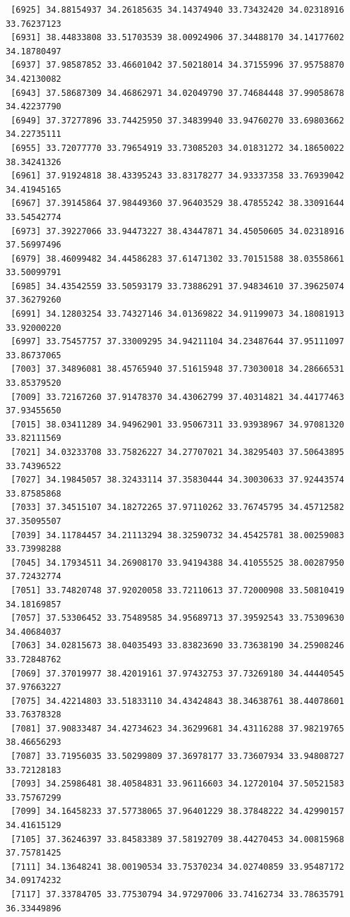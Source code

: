 \documentclass[
  letterpaper,
  DIV=11,
  numbers=noendperiod]{scrartcl}
\begin{document}
\begin{verbatim}
 [6925] 34.88154937 34.26185635 34.14374940 33.73432420 34.02318916 33.76237123
 [6931] 38.44833808 33.51703539 38.00924906 37.34488170 34.14177602 34.18780497
 [6937] 37.98587852 33.46601042 37.50218014 34.37155996 37.95758870 34.42130082
 [6943] 37.58687309 34.46862971 34.02049790 37.74684448 37.99058678 34.42237790
 [6949] 37.37277896 33.74425950 37.34839940 33.94760270 33.69803662 34.22735111
 [6955] 33.72077770 33.79654919 33.73085203 34.01831272 34.18650022 38.34241326
 [6961] 37.91924818 38.43395243 33.83178277 34.93337358 33.76939042 34.41945165
 [6967] 37.39145864 37.98449360 37.96403529 38.47855242 38.33091644 33.54542774
 [6973] 37.39227066 33.94473227 38.43447871 34.45050605 34.02318916 37.56997496
 [6979] 38.46099482 34.44586283 37.61471302 33.70151588 38.03558661 33.50099791
 [6985] 34.43542559 33.50593179 33.73886291 37.94834610 37.39625074 37.36279260
 [6991] 34.12803254 33.74327146 34.01369822 34.91199073 34.18081913 33.92000220
 [6997] 33.75457757 37.33009295 34.94211104 34.23487644 37.95111097 33.86737065
 [7003] 37.34896081 38.45765940 37.51615948 37.73030018 34.28666531 33.85379520
 [7009] 33.72167260 37.91478370 34.43062799 37.40314821 34.44177463 37.93455650
 [7015] 38.03411289 34.94962901 33.95067311 33.93938967 34.97081320 33.82111569
 [7021] 34.03233708 33.75826227 34.27707021 34.38295403 37.50643895 33.74396522
 [7027] 34.19845057 38.32433114 37.35830444 34.30030633 37.92443574 33.87585868
 [7033] 37.34515107 34.18272265 37.97110262 33.76745795 34.45712582 37.35095507
 [7039] 34.11784457 34.21113294 38.32590732 34.45425781 38.00259083 33.73998288
 [7045] 34.17934511 34.26908170 33.94194388 34.41055525 38.00287950 37.72432774
 [7051] 33.74820748 37.92020058 33.72110613 37.72000908 33.50810419 34.18169857
 [7057] 37.53306452 33.75489585 34.95689713 37.39592543 33.75309630 34.40684037
 [7063] 34.02815673 38.04035493 33.83823690 33.73638190 34.25908246 33.72848762
 [7069] 37.37019977 38.42019161 37.97432753 37.73269180 34.44440545 37.97663227
 [7075] 34.42214803 33.51833110 34.43424843 38.34638761 38.44078601 33.76378328
 [7081] 37.90833487 34.42734623 34.36299681 34.43116288 37.98219765 38.46656293
 [7087] 33.71956035 33.50299809 37.36978177 33.73607934 33.94808727 33.72128183
 [7093] 34.25986481 38.40584831 33.96116603 34.12720104 37.50521583 33.75767299
 [7099] 34.16458233 37.57738065 37.96401229 38.37848222 34.42990157 34.41615129
 [7105] 37.36246397 33.84583389 37.58192709 38.44270453 34.00815968 37.75781425
 [7111] 34.13648241 38.00190534 33.75370234 34.02740859 33.95487172 34.09174232
 [7117] 37.33784705 33.77530794 34.97297006 33.74162734 33.78635791 36.33449896

\end{verbatim}
\end{document}
